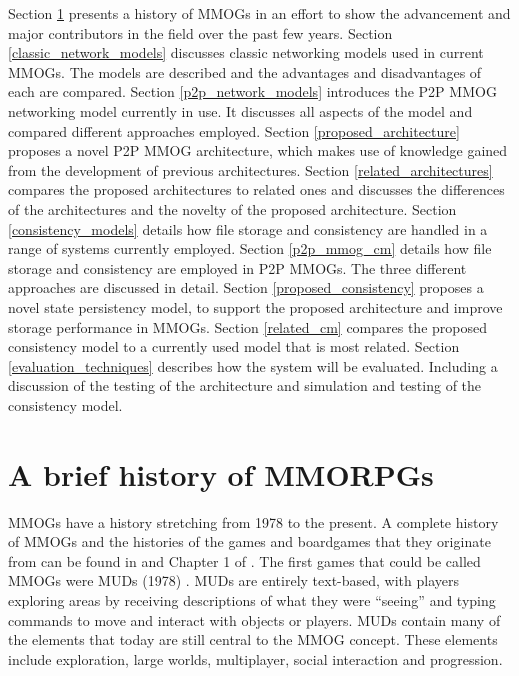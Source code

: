 \documentclass[journal,oneside,a4paper,onecolumn]{IEEEtran}
\begin{document}
Section \ref{mmog_history} presents a history of MMOGs in an effort to show the advancement and major contributors in the field over the past few years.
%
Section \ref{classic_network_models} discusses classic networking models used in current MMOGs. The models are described and the advantages and disadvantages of each are compared.
%
Section \ref{p2p_network_models} introduces the P2P MMOG networking model currently in use. It discusses all aspects of the model and compared different approaches employed.
%
Section \ref{proposed_architecture} proposes a novel P2P MMOG architecture, which makes use of knowledge gained from the development of previous architectures.
%
Section \ref{related_architectures} compares the proposed architectures to related ones and discusses the differences of the architectures and the novelty of the proposed architecture.
%
Section \ref{consistency_models} details how file storage and consistency are handled in a range of systems currently employed.
%
Section \ref{p2p_mmog_cm} details how file storage and consistency are employed in P2P MMOGs. The three different approaches are discussed in detail.
%
Section \ref{proposed_consistency} proposes a novel state persistency model, to support the proposed architecture and improve storage performance in MMOGs.
%
Section \ref{related_cm} compares the proposed consistency model to a currently used model that is most related.
%
Section \ref{evaluation_techniques} describes how the system will be evaluated. Including a discussion of the testing of the architecture and simulation and testing of the consistency model.
%



\section{A brief history of MMORPGs}
\label{mmog_history}

\acp{MMOG} have a history stretching from 1978 to the present. A complete history of \acp{MMOG} and the histories of the games and boardgames that they originate from can be found in \cite{mmog_past_present_future} and Chapter 1 of \cite{designing_virtual_worlds}. The first games that could be called \acp{MMOG} were \acp{MUD} (1978) \cite{mud_intro}. \acp{MUD} are entirely text-based, with players exploring areas by receiving descriptions of what they were ``seeing'' and typing commands to move and interact with objects or players. \acp{MUD} contain many of the elements that today are still central to the \ac{MMOG} concept. These elements include exploration, large worlds, multiplayer, social interaction and progression.
\end{document}
